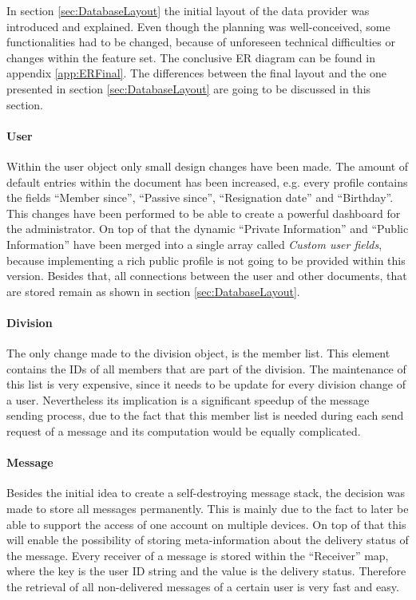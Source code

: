 In section \vref{sec:DatabaseLayout} the initial layout of the data provider was introduced and explained. Even though the planning was well-conceived, some functionalities had to be changed, because of unforeseen technical difficulties or changes within the feature set. The conclusive \gls{ER} diagram can be found in appendix \vref{app:ERFinal}. The differences between the final layout and the one presented in section \vref{sec:DatabaseLayout} are going to be discussed in this section.

\paragraph{User}
Within the user object only small design changes have been made. The amount of default entries within the document has been increased, e.g. every profile contains the fields \enquote{Member since}, \enquote{Passive since}, \enquote{Resignation date} and \enquote{Birthday}. This changes have been performed to be able to create a powerful dashboard for the administrator. On top of that the dynamic \enquote{Private Information} and \enquote{Public Information} have been merged into a single array called \emph{Custom user fields}, because implementing a rich public profile is not going to be provided within this version. Besides that, all connections between the user and other documents, that are stored remain as shown in section \vref{sec:DatabaseLayout}.

\paragraph{Division}
The only change made to the division object, is the member list. This element contains the IDs of all members that are part of the division. The maintenance of this list is very expensive, since it needs to be update for every division change of a user. Nevertheless its implication is a significant speedup of the message sending process, due to the fact that this member list is needed during each send request of a message and its computation would be equally complicated.

\paragraph{Message}

Besides the initial idea to create a self-destroying message stack, the decision was made to store all messages permanently. This is mainly due to the fact to later be able to support the access of one account on multiple devices. On top of that this will enable the possibility of storing meta-information about the delivery status of the message. Every receiver of a message is stored within the \enquote{Receiver} map, where the key is the user ID string and the value is the delivery status. Therefore the retrieval of all non-delivered messages of a certain user is very fast and easy.

